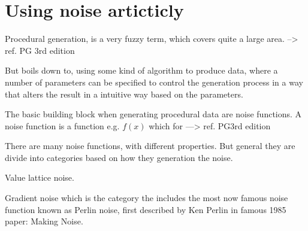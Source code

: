 
\chapter{Using noise articticly}
Procedural generation, is a very fuzzy term, which covers quite a
large area.
--> ref. PG 3rd edition

But boils down to, using some kind of algorithm to produce data, where
a number of parameters can be specified to control the
generation process in a way that alters the result in a intuitive way
based on the parameters.

The basic building block when generating procedural data are noise
functions. A noise function is a function e.g. $f(x)$ which for 
---> ref. PG3rd edition 

There are many noise functions, with different properties. But general
they are divide into categories based on how they generation the
noise.

Value lattice noise.

Gradient noise which is the category the includes the most 
now famous noise function known as Perlin noise, first described by Ken
Perlin in famous 1985 paper: Making Noise. 



